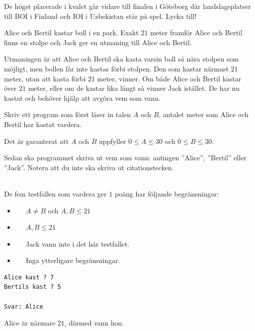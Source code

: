 De högst placerade i kvalet går vidare till finalen i Göteborg där landslagsplatser till BOI i Finland och IOI i Uzbekistan står på spel. Lycka till!
\begin{center}
\end{center}
%

\setlength{\parskip}{\oldparskip}

\newpage


Alice och Bertil kastar boll i en park. Exakt $21$ meter framför Alice och Bertil finns en stolpe och Jack ger en utmaning till Alice och Bertil.

Utmaningen är att Alice och Bertil ska kasta varsin boll så nära stolpen som möjligt, men bollen får inte kastas förbi stolpen.
Den som kastar närmast $21$ meter, utan att kasta förbi $21$ meter, vinner. Om både Alice och Bertil kastar över $21$ meter, eller om de kastar lika långt så vinner Jack istället. De har nu kastat och behöver hjälp att avgöra vem som vann.

Skriv ett program som först läser in talen $A$ och $B$, antalet meter som Alice och
Bertil har kastat vardera.

Det är garanterat att $A$ och $B$ uppfyller $0 \leq A \leq 30$ och $0 \leq B \leq 30$.

Sedan ska programmet skriva ut vem som vann: antingen ''Alice'', ''Bertil'' eller ''Jack''. Notera att du inte ska skriva ut citationstecken.

\\
De fem testfallen som vardera ger $1$ poäng har följande begränsningar:
\begin{itemize}
  \item[(1)] $\;\;\;\;$ $A \neq B$ och $A,B \leq 21$
  \item[(2)] $\;\;\;\;$ $A, B \leq 21$
  \item[(3)] $\;\;\;\;$ Jack vann inte i det här testfallet.
  \item[(4-5)] $\;\;\;\; $ Inga ytterligare begränsningar.
\end{itemize}


\vspace{1cm}
\begin{verbatim}
Alice kast ? 7
Bertils kast ? 5

Svar: Alice
\end{verbatim}
 Alice är närmare $21$, därmed vann hon.

